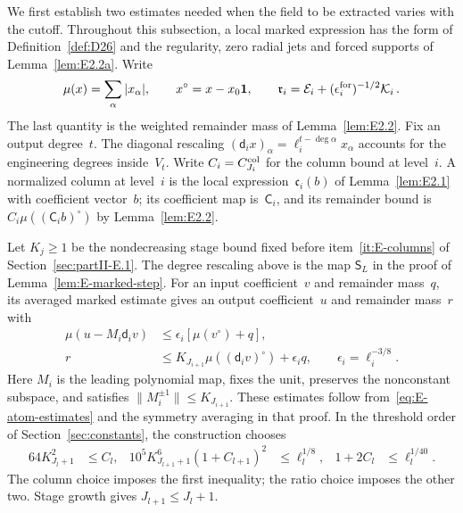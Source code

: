 We first establish two estimates needed when the field to be extracted varies with the cutoff. Throughout this subsection, a local marked expression has the form of Definition~\ref{def:D26} and the regularity, zero radial jets and forced supports of Lemma~\ref{lem:E2.2a}. Write
\begin{equation*}
\mu(x)=\sum_\alpha|x_\alpha|,\qquad x^\circ=x-x_0\mathbf1,
\qquad \mathfrak r_i=\mathcal E_i+(\epsilon_i^{\rm for})^{-1/2}\mathcal K_i\,.
\end{equation*}
The last quantity is the weighted remainder mass of Lemma~\ref{lem:E2.2}. Fix an output degree~$t$. The diagonal rescaling $(\mathsf d_i x)_\alpha=\ell_i^{t-\deg\alpha}x_\alpha$ accounts for the engineering degrees inside~$V_t$. Write $C_i=C^{\rm col}_{J_i}$ for the column bound at level~$i$. A normalized column at level~$i$ is the local expression~$\mathfrak c_i(b)$ of Lemma~\ref{lem:E2.1} with coefficient vector~$b$; its coefficient map is~$\mathsf C_i$, and its remainder bound is $C_i\mu((\mathsf C_i b)^\circ)$ by Lemma~\ref{lem:E2.2}.

Let $K_j\ge1$ be the nondecreasing stage bound fixed before item~\ref{it:E-columns} of Section~\ref{sec:partII-E.1}. The degree rescaling above is the map $\mathsf S_L$ in the proof of Lemma~\ref{lem:E-marked-step}. For an input coefficient~$v$ and remainder mass~$q$, its averaged marked estimate gives an output coefficient~$u$ and remainder mass~$r$ with
\begin{equation}\label{eq:J-marked-recall}
\begin{aligned}
\mu(u-M_i\mathsf d_iv)&\le\epsilon_i[\mu(v^\circ)+q],\\
r&\le K_{J_{i+1}}\mu((\mathsf d_iv)^\circ)+\epsilon_iq,\qquad\epsilon_i=\ell_i^{-3/8}.
\end{aligned}
\end{equation}
Here $M_i$ is the leading polynomial map, fixes the unit, preserves the nonconstant subspace, and satisfies $\|M_i^{\pm1}\|\le K_{J_{i+1}}$. These estimates follow from~\eqref{eq:E-atom-estimates} and the symmetry averaging in that proof. In the threshold order of Section~\ref{sec:constants}, the construction chooses
\begin{equation}\label{eq:J-stage-room}
\begin{aligned}
64K_{J_l+1}^2&\le C_l,&
10^5K_{J_{l+1}+1}^6(1+C_{l+1})^2&\le\ell_l^{1/8},&
1+2C_l&\le\ell_l^{1/40}.
\end{aligned}
\end{equation}
The column choice imposes the first inequality; the ratio choice imposes the other two. Stage growth gives $J_{l+1}\le J_l+1$.

